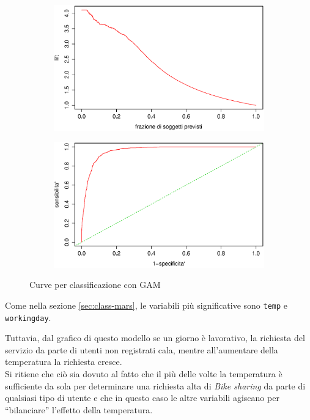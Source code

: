 \begin{figure}[H]
  \begin{subfigure}{0.4\textwidth}
    \includegraphics[width=\columnwidth]{images/class/lift-gam.eps}
  \end{subfigure}
  \hspace*{\fill}
  \begin{subfigure}{0.4\textwidth}
    \includegraphics[width=\columnwidth]{images/class/roc-gam.eps}
  \end{subfigure}
  \caption{Curve per classificazione con GAM}
  \label{fig:class-reg-1og}
\end{figure}

Come nella sezione \ref{sec:class-mars}, le variabili più significative sono
\texttt{temp} e \texttt{workingday}.

Tuttavia, dal grafico di questo modello se un giorno è lavorativo, la
richiesta del servizio da parte di utenti non registrati cala, mentre
all'aumentare della temperatura la richiesta cresce. \\
Si ritiene che ciò sia dovuto al fatto che il più delle volte la temperatura è
sufficiente da sola per determinare una richiesta alta di \emph{Bike sharing}
da parte di qualsiasi tipo di utente e che in questo caso le altre variabili
agiscano per ``bilanciare'' l'effetto della temperatura.

